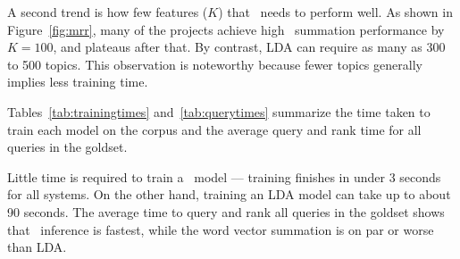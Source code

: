 A second trend is how few features ($K$) that \dv\ needs to perform well.
As shown in Figure~\ref{fig:mrr}, many of the projects achieve high \dv\ 
summation performance by $K=100$, and plateaus after that. By contrast,
LDA can require as many as 300 to 500 topics.
This observation is noteworthy because fewer topics generally implies less training time.

Tables~\ref{tab:trainingtimes} and~\ref{tab:querytimes} summarize the time taken
to train each model on the corpus and the average query and rank time for all
queries in the goldset.

Little time is required to train a \dv\ model --- training finishes in under
3 seconds for all systems. On the other hand, training an LDA model can take up to about 90 seconds.
The average time to query and rank all queries in the goldset shows that \dv\ 
inference is fastest, while the word vector summation is on par or worse than
LDA.


